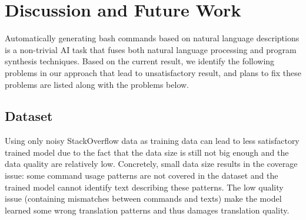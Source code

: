 \section{Discussion and Future Work}

Automatically generating bash commands based on natural language descriptions is a non-trivial AI task that fuses both natural language processing and program synthesis techniques. Based on the current result, we identify the following problems in our approach that lead to unsatisfactory result, and plans to fix these problems are listed along with the problems below.

\subsection{Dataset}

Using only noisy StackOverflow data as training data can lead to less satisfactory trained model due to the fact that the data size is still not big enough and the data quality are relatively low. Concretely, small data size results in the coverage issue: some command usage patterns are not covered in the dataset and the trained model cannot identify text describing these patterns. The low quality issue (containing mismatches between commands and texts) make the model learned some wrong translation patterns and thus damages translation quality. 


